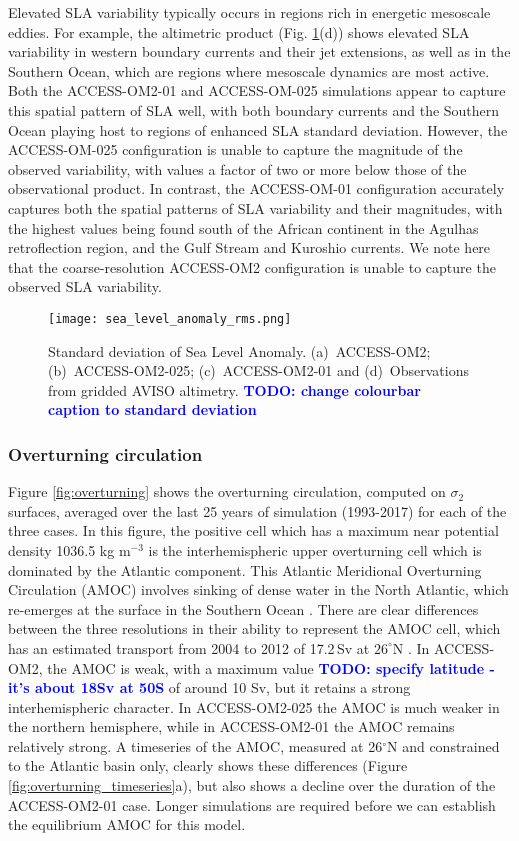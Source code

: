 \documentclass[gmd, manuscript]{copernicus}
\newcommand{\TODO}[1]{\textcolor{blue}{\textsf{\textbf{TODO: #1}}}}
\begin{document}
Elevated SLA variability typically occurs in regions rich in energetic mesoscale eddies. 
For example, the altimetric product (Fig. \ref{fig:SL-RMS}(d)) shows elevated SLA variability in western boundary currents and their jet extensions, as well as in the Southern Ocean, which are regions where mesoscale dynamics are most active. 
Both the ACCESS-OM2-01 and ACCESS-OM-025 simulations appear to capture this spatial pattern of SLA well, with both boundary currents and the Southern Ocean playing host to regions of enhanced SLA standard deviation. 
However, the ACCESS-OM-025 configuration is unable to capture the magnitude of the observed variability, with values a factor of two or more below those of the observational product. 
In contrast, the ACCESS-OM-01 configuration accurately captures both the spatial patterns of SLA variability and their magnitudes, with the highest values being found south of the African continent in the Agulhas retroflection region, and the Gulf Stream and Kuroshio currents. 
We note here that the coarse-resolution ACCESS-OM2 configuration is unable to capture the observed SLA variability. 


\begin{figure}[t]
\texttt{[image: sea\_level\_anomaly\_rms.png]}
\caption{Standard deviation of Sea Level Anomaly. (a)~ACCESS-OM2; (b)~ACCESS-OM2-025; (c)~ACCESS-OM2-01 and (d)~Observations from gridded AVISO altimetry.  
\TODO{change colourbar caption to standard deviation}
\label{fig:SL-RMS}}
\end{figure}



\subsubsection{Overturning circulation}
Figure \ref{fig:overturning} shows the overturning circulation, computed on $\sigma_2$ surfaces, averaged over the last 25 years of simulation (1993-2017) for each of the three cases.
In this figure, the positive cell which has a maximum near potential density 1036.5 kg m$^{-3}$ is the interhemispheric upper overturning cell which is dominated by the Atlantic component.
This Atlantic Meridional Overturning Circulation (AMOC) involves sinking of dense water in the North Atlantic, which re-emerges at the surface in the Southern Ocean \citep{MarshallSpeer2012a}. 
There are clear differences between the three resolutions in their ability to represent the AMOC cell, which has an estimated transport from 2004 to 2012 of 17.2\,Sv at $26^\circ$N \citep{McCarthy:2015}.
In ACCESS-OM2, the AMOC is weak, with a maximum value \TODO{specify latitude - it's about 18Sv at 50S} of around 10 Sv, but it retains a strong interhemispheric character. 
In ACCESS-OM2-025 the AMOC is much weaker in the northern hemisphere, while in ACCESS-OM2-01 the AMOC remains relatively strong.
A timeseries of the AMOC, measured at 26$^\circ$N and constrained to the Atlantic basin only, clearly shows these differences (Figure \ref{fig:overturning_timeseries}a), but also shows a decline over the duration of the ACCESS-OM2-01 case.
Longer simulations are required before we can establish the equilibrium AMOC for this model.
\end{document}

